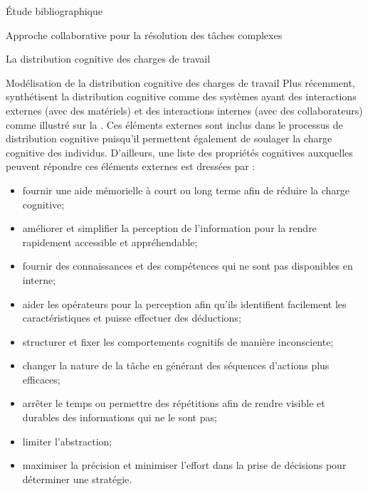 \documentclass[myfrancais,ngerman,english,french]{mythesis}
\begin{document}
\begin{mychapter}{Étude bibliographique}
\begin{mysection}{Approche collaborative pour la résolution des tâches complexes}
\begin{mysubsection}{La distribution cognitive des charges de travail}
\begin{mysubsubsection}{Modélisation de la distribution cognitive des charges de travail}
					Plus récemment,  synthétisent la distribution cognitive comme des systèmes ayant des interactions externes (avec des matériels)  et des interactions internes (avec des collaborateurs) comme illustré sur la .
					Ces éléments externes sont inclus dans le processus de distribution cognitive puisqu'il permettent également de soulager la charge cognitive des individus.
					D'ailleurs, une liste des propriétés cognitives auxquelles peuvent répondre ces éléments externes est dressées par  :
					\begin{itemize}
						\item fournir une aide mémorielle à court ou long terme afin de réduire la charge cognitive;
						\item améliorer et simplifier la perception de l'information pour la rendre rapidement accessible et appréhendable;
						\item fournir des connaissances et des compétences qui ne sont pas disponibles en interne;
						\item aider les opérateurs pour la perception afin qu'ils identifient facilement les caractéristiques et puisse effectuer des déductions;
						\item structurer et fixer les comportements cognitifs de manière inconsciente;
						\item changer la nature de la tâche en générant des séquences d'actions plus efficaces;
						\item arrêter le temps ou permettre des répétitions afin de rendre visible et durables des informations qui ne le sont pas;
						\item limiter l'abstraction;
						\item maximiser la précision et minimiser l'effort dans la prise de décisions pour déterminer une stratégie.
					\end{itemize}


\end{mysubsubsection}
\end{mysubsection}
\end{mysection}
\end{mychapter}
\end{document}
